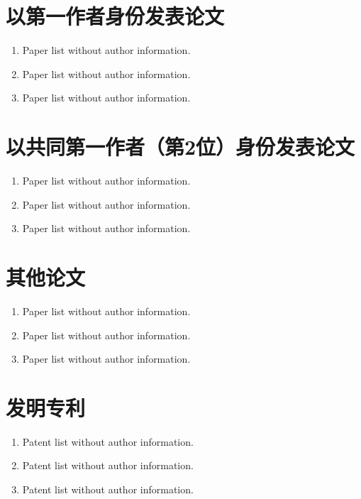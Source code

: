 \cleardoublepage
{}

{%
    \section*{以第一作者身份发表论文}
    \begin{enumerate}
        \item Paper list without author information.
        \item Paper list without author information.
        \item Paper list without author information.
    \end{enumerate}

    \section*{以共同第一作者（第2位）身份发表论文}
    \begin{enumerate}
        \item Paper list without author information.
        \item Paper list without author information.
        \item Paper list without author information.
    \end{enumerate}

    \section*{其他论文}
    \begin{enumerate}
        \item Paper list without author information.
        \item Paper list without author information.
        \item Paper list without author information.
    \end{enumerate}

    \section*{发明专利}
    \begin{enumerate}
        \item Patent list without author information.
        \item Patent list without author information.
        \item Patent list without author information.
    \end{enumerate}
}
